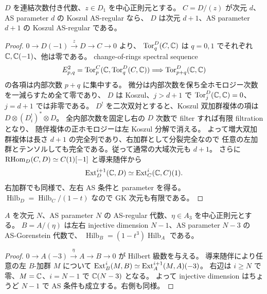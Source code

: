 \begin{lemma}\label{lem:pg-central-linear}
$D$ を連結次数付き代数、$z\in D_1$ を中心正則元とする。
$C=D/(z)$ が次元 $d$、AS parameter $d$ の Koszul AS-regular なら、
$D$ は次元 $d+1$、AS parameter $d+1$ の Koszul AS-regular である。
\end{lemma}
\begin{proof}
$0\to D(-1)\xrightarrow{z}D\to C\to0$ より、
$\operatorname{Tor}^D_q(C,\mathbb C)$ は $q=0,1$ でそれぞれ $\mathbb C,\mathbb C(-1)$、他は零である。
change-of-rings spectral sequence
\begin{equation}
E^2_{p,q}=\operatorname{Tor}^C_p(\mathbb C,\operatorname{Tor}^D_q(C,\mathbb C))
\Longrightarrow\operatorname{Tor}^D_{p+q}(\mathbb C,\mathbb C)
\end{equation}
の各項は内部次数 $p+q$ に集中する。
微分は内部次数を保ち全ホモロジー次数を一減らすため全て零であり、
$D$ は Koszul、$j>d+1$ で $\operatorname{Tor}^D_j(\mathbb C,\mathbb C)=0$、$j=d+1$ では非零である。
$D^!$ を二次双対とすると、Koszul 双加群複体の項は $D\otimes(D_i^!)^*\otimes D$。
全内部次数を固定し右の $D$ 次数で filter すれば有限 filtration となり、
随伴複体の正ホモロジーは左 Koszul 分解で消える。
よって増大双加群複体は長さ $d+1$ の完全列であり、右加群として分裂完全なので
任意の左加群とテンソルしても完全である。従って通常の大域次元も $d+1$。
さらに $\operatorname{RHom}_D(C,D)\simeq C(1)[-1]$ と導来随伴から
\begin{equation}
\operatorname{Ext}_D^{i+1}(\mathbb C,D)\simeq\operatorname{Ext}_C^i(\mathbb C,C)(1).
\end{equation}
右加群でも同様で、左右 AS 条件と parameter を得る。
$\operatorname{Hilb}_D=\operatorname{Hilb}_C/(1-t)$ なので GK 次元も有限である。
\end{proof}
\begin{lemma}\label{lem:pg-central-cubic}
$A$ を次元 $N$、AS parameter $N$ の AS-regular 代数、$\eta\in A_3$ を中心正則元とする。
$B=A/(\eta)$ は左右 injective dimension $N-1$、AS parameter $N-3$ の AS-Gorenstein 代数で、
$\operatorname{Hilb}_B=(1-t^3)\operatorname{Hilb}_A$ である。
\end{lemma}
\begin{proof}
$0\to A(-3)\xrightarrow{\eta}A\to B\to0$ が Hilbert 級数を与える。
導来随伴により任意の左 $B$-加群 $M$ について
$\operatorname{Ext}_B^i(M,B)\simeq\operatorname{Ext}_A^{i+1}(M,A)(-3)$。
右辺は $i\geq N$ で零、$M=\mathbb C$、$i=N-1$ で $\mathbb C(N-3)$ となる。
よって injective dimension はちょうど $N-1$ で AS 条件も成立する。右側も同様。
\end{proof}

